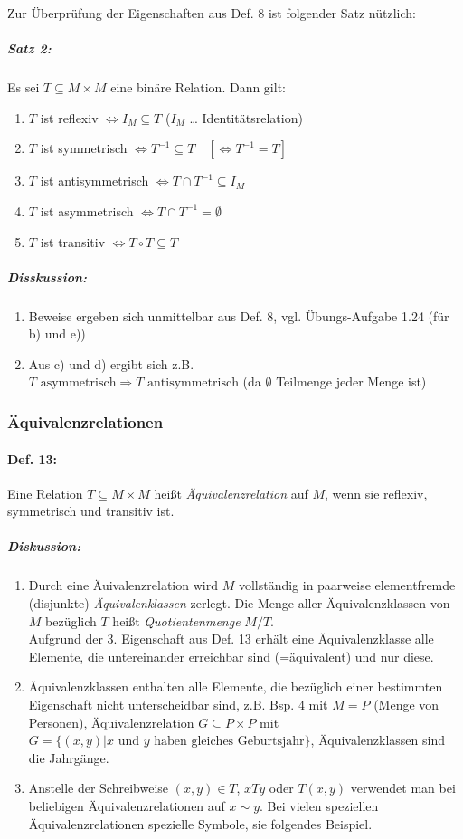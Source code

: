 Zur Überprüfung der Eigenschaften aus Def. 8 ist folgender Satz nützlich:
\subparagraph{Satz 2:} \parskp
Es sei $T \subseteq M \times M$ eine binäre Relation. Dann gilt:
\begin{enumerate} [label=\alph*)]
\item $T$ ist reflexiv $\Leftrightarrow I_M \subseteq T$  ($I_M$ … Identitätsrelation)
\item $T$ ist symmetrisch $\Leftrightarrow T^{-1}\subseteq T \quad [\Leftrightarrow T^{-1} = T] $
\item $T$ ist antisymmetrisch $\Leftrightarrow T \cap T^{-1} \subseteq I_M$
\item $T$ ist asymmetrisch $\Leftrightarrow T \cap T^{-1} = \emptyset$
\item $T$ ist transitiv $\Leftrightarrow T \circ T \subseteq T$
\end{enumerate}

\subparagraph{Disskussion:}
\begin{enumerate}
\item Beweise ergeben sich unmittelbar aus Def. 8, vgl. Übungs-Aufgabe 1.24 (für b) und e))
\item Aus c) und d) ergibt sich z.B.\\
$\boxed{T \text{ asymmetrisch}}\Rightarrow \boxed{T \text{ antisymmetrisch}}$ (da $\emptyset$ Teilmenge jeder Menge ist)
\end{enumerate}

\subsubsection{Äquivalenzrelationen} \label{subsec:Äquivalenzrelationen}
\paragraph{Def. 13:} \parskp
Eine Relation $T \subseteq M \times M$ heißt \emph{Äquivalenzrelation} auf $M$, wenn sie reflexiv, symmetrisch und transitiv ist.
\subparagraph{Diskussion:}
\begin{enumerate}
\item Durch eine Äuivalenzrelation wird $M$ vollständig in paarweise elementfremde (disjunkte) \emph{Äquivalenklassen} zerlegt. Die Menge aller Äquivalenzklassen von $M$ bezüglich $T$ heißt \emph{Quotientenmenge} $M/T$.\\
Aufgrund der 3. Eigenschaft aus Def. 13 erhält eine Äquivalenzklasse alle Elemente, die untereinander erreichbar sind (=äquivalent) und nur diese.
\item Äquivalenzklassen enthalten alle Elemente, die bezüglich einer bestimmten Eigenschaft nicht unterscheidbar sind, z.B. Bsp. 4 mit $M=P$ (Menge von Personen), Äquivalenzrelation $G\subseteq P \times P$ mit $G=\{ (x,y) | x \text{ und } y \text{ haben gleiches Geburtsjahr}\}$, Äquivalenzklassen sind die Jahrgänge.
\item Anstelle der Schreibweise $(x,y) \in T$, $xTy$ oder $T(x,y)$ verwendet man bei beliebigen Äquivalenzrelationen auf $x\sim y$. Bei vielen speziellen Äquivalenzrelationen spezielle Symbole, sie folgendes Beispiel.
\end{enumerate}


